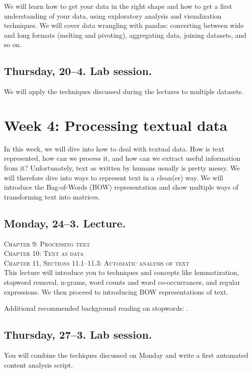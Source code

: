 We will learn how to get your data in the right shape and how to get a first understanding of your data, using exploratory analysis and visualization techniques. We will cover data wrangling with pandas: converting between wide and long formats (melting and pivoting), aggregating data, joining datasets, and so on.

\subsection*{Thursday, 20--4. Lab session.}
We will apply the techniques discussed during the lectures to multiple datasets.



\section*{Week 4: Processing textual data}
In this week, we will dive into how to deal with textual data. How is text represented, how can we process it, and how can we extract useful information from it?
Unfortunately, text as written by humans usually is pretty messy.  We will therefore dive  into ways to represent text in a clean(er) way. We will introduce the Bag-of-Words (BOW) representation and show multiple ways of transforming text into matrices.

\subsection*{Monday, 24--3. Lecture.}
\textsc{ Chapter 9: Processing text}\\
\textsc{ Chapter 10: Text as data}\\
\textsc{ Chapter 11, Sections 11.1--11.3: Automatic analysis of text}\\
  
This lecture will introduce you to techniques and concepts like lemmatization, stopword removal, n-grams, word counts and word co-occurrances, and regular expressions. We then proceed to introducing BOW representations of text.

Additional recommended background reading on stopwords: \cite{Nothman2018}.

\subsection*{Thursday, 27--3. Lab session.}
You will combine the techiques discussed on Monday and write a first automated content analysis script.

